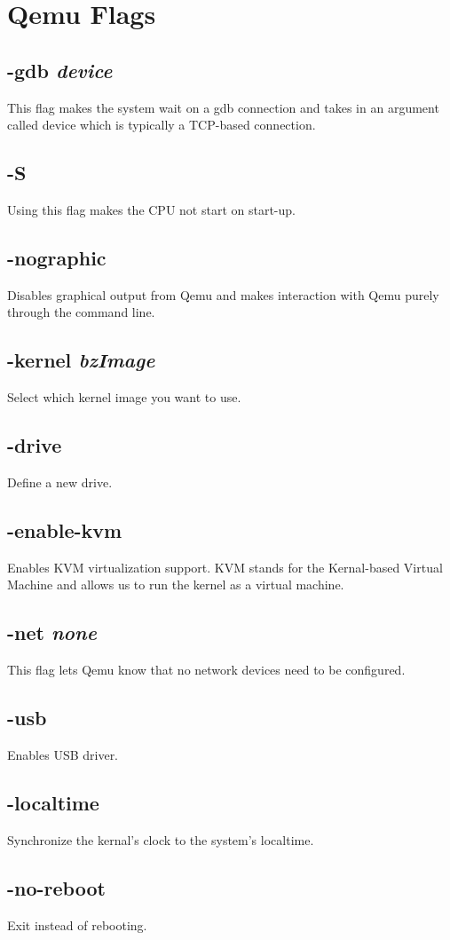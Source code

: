 \documentclass{article}
\begin{document}
\section*{Qemu Flags}
\subsection*{-gdb \textit{device}}
This flag makes the system wait on a gdb connection and takes in an argument called device 
which is typically a TCP-based connection.
\subsection*{-S}
Using this flag makes the CPU not start on start-up.
\subsection*{-nographic}
Disables graphical output from Qemu and makes interaction with Qemu purely through the 
command line.
\subsection*{-kernel \textit{bzImage}}
Select which kernel image you want to use.
\subsection*{-drive}
Define a new drive.
\subsection*{-enable-kvm}
Enables KVM virtualization support. KVM stands for the Kernal-based Virtual Machine and allows
us to run the kernel as a virtual machine.
\subsection*{-net \textit{none}}
This flag lets Qemu know that no network devices need to be configured.
\subsection*{-usb}
Enables USB driver.
\subsection*{-localtime}
Synchronize the kernal's clock to the system's localtime.
\subsection*{-no-reboot}
Exit instead of rebooting.
\end{document}
